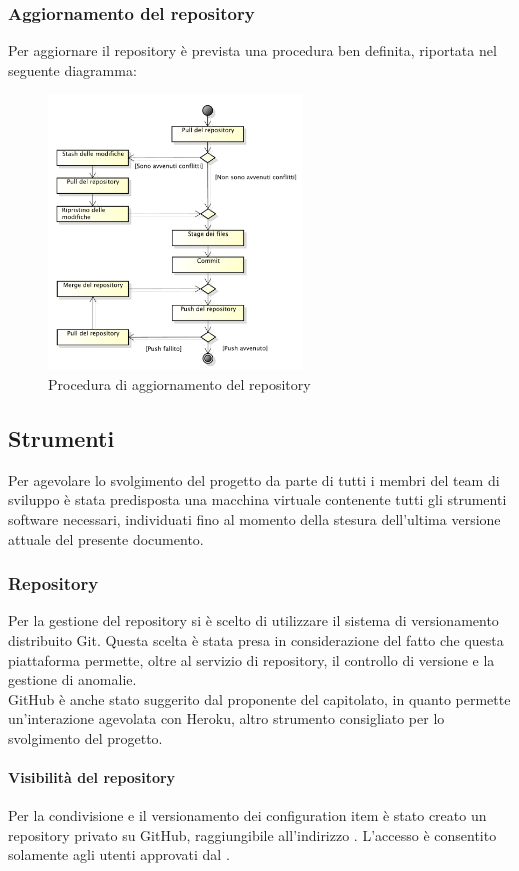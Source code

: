 		\subsubsection{Aggiornamento del repository}
				Per aggiornare il repository è prevista una procedura ben definita, riportata nel seguente diagramma:
				\begin{figure}[H]
					\centering
					\includegraphics[width=0.6\textwidth]{NormeDiProgetto/Pics/Commit}
					\caption{Procedura di aggiornamento del repository}
				\end{figure}
		
	\subsection{Strumenti}
		Per agevolare lo svolgimento del progetto da parte di tutti i membri del team di sviluppo è stata predisposta una macchina virtuale contenente tutti gli strumenti software necessari, individuati fino al momento della stesura dell'ultima versione attuale del presente documento.
		\subsubsection{Repository}
			Per la gestione del repository si è scelto di utilizzare il sistema di versionamento distribuito Git. Questa scelta è stata presa in considerazione del fatto che questa piattaforma permette, oltre al servizio di repository, il controllo di versione e la gestione di anomalie. \\
			GitHub è anche stato suggerito dal proponente del capitolato, in quanto permette un'interazione agevolata con Heroku, altro strumento consigliato per lo svolgimento del progetto. 
				\paragraph{Visibilità del repository}
				Per la condivisione e il versionamento dei configuration item è stato creato un repository privato su GitHub, raggiungibile all’indirizzo . L’accesso è consentito solamente agli utenti approvati dal .
